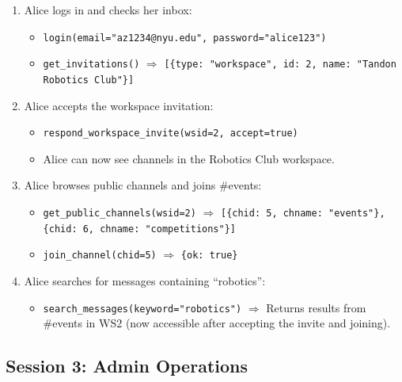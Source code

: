 \documentclass[11pt]{article}
\begin{document}
\begin{enumerate}
    \item Alice logs in and checks her inbox:
    \begin{itemize}
        \item \texttt{login(email="az1234@nyu.edu", password="alice123")}
        \item \texttt{get\_invitations()} $\Rightarrow$ \texttt{[\{type: "workspace", id: 2, name: "Tandon Robotics Club"\}]}
    \end{itemize}

    \item Alice accepts the workspace invitation:
    \begin{itemize}
        \item \texttt{respond\_workspace\_invite(wsid=2, accept=true)}
        \item Alice can now see channels in the Robotics Club workspace.
    \end{itemize}

    \item Alice browses public channels and joins \#events:
    \begin{itemize}
        \item \texttt{get\_public\_channels(wsid=2)} $\Rightarrow$ \texttt{[\{chid: 5, chname: "events"\}, \{chid: 6, chname: "competitions"\}]}
        \item \texttt{join\_channel(chid=5)} $\Rightarrow$ \texttt{\{ok: true\}}
    \end{itemize}

    \item Alice searches for messages containing ``robotics'':
    \begin{itemize}
        \item \texttt{search\_messages(keyword="robotics")} $\Rightarrow$ Returns results from \#events in WS2 (now accessible after accepting the invite and joining).
    \end{itemize}
\end{enumerate}

\subsection{Session 3: Admin Operations}
\end{document}
